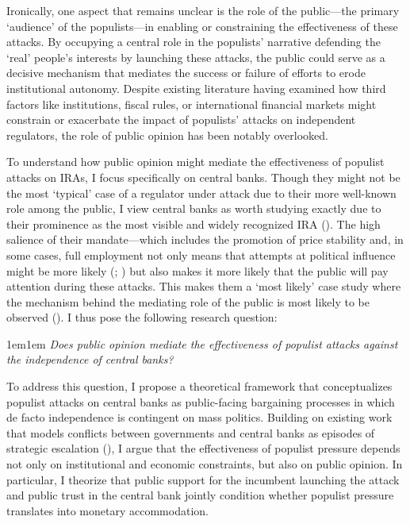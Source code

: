 \documentclass[
  11pt,
  letterpaper,
  DIV=11,
  numbers=noendperiod]{scrartcl}
\begin{document}
Ironically, one aspect that remains unclear is the role of the
public---the primary `audience' of the populists---in enabling or
constraining the effectiveness of these attacks. By occupying a central
role in the populists' narrative defending the `real' people's interests
by launching these attacks, the public could serve as a decisive
mechanism that mediates the success or failure of efforts to erode
institutional autonomy. Despite existing literature having examined how
third factors like institutions, fiscal rules, or international
financial markets might constrain or exacerbate the impact of populists'
attacks on independent regulators, the role of public opinion has been
notably overlooked.

To understand how public opinion might mediate the effectiveness of
populist attacks on IRAs, I focus specifically on central banks. Though
they might not be the most `typical' case of a regulator under attack
due to their more well-known role among the public, I view central banks
as worth studying exactly due to their prominence as the most visible
and widely recognized IRA (). The high salience of their mandate---which includes
the promotion of price stability and, in some cases, full employment not
only means that attempts at political influence might be more likely
(;
) but
also makes it more likely that the public will pay attention during
these attacks. This makes them a `most likely' case study where the
mechanism behind the mediating role of the public is most likely to be
observed (). I thus pose the
following research question:

\begin{adjustwidth}{1em}{1em}
\emph{Does public opinion mediate the effectiveness of populist attacks against the independence of central banks?}
\end{adjustwidth}

To address this question, I propose a theoretical framework that
conceptualizes populist attacks on central banks as public-facing
bargaining processes in which de facto independence is contingent on
mass politics. Building on existing work that models conflicts between
governments and central banks as episodes of strategic escalation
(), I argue that the
effectiveness of populist pressure depends not only on institutional and
economic constraints, but also on public opinion. In particular, I
theorize that public support for the incumbent launching the attack and
public trust in the central bank jointly condition whether populist
pressure translates into monetary accommodation.
\end{document}
